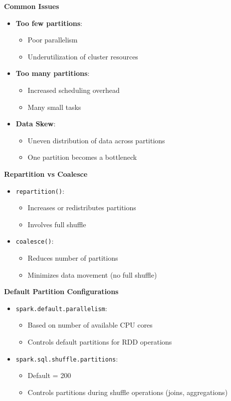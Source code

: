 \documentclass[10pt,a4paper]{article}
\begin{document}
	\textbf{Common Issues}
	\begin{itemize}
	    \item \textbf{Too few partitions}:
	    \begin{itemize}
	        \item Poor parallelism
	        \item Underutilization of cluster resources
	    \end{itemize}
	    
	    \item \textbf{Too many partitions}:
	    \begin{itemize}
	        \item Increased scheduling overhead
	        \item Many small tasks
	    \end{itemize}
	    
	    \item \textbf{Data Skew}:
	    \begin{itemize}
	        \item Uneven distribution of data across partitions
	        \item One partition becomes a bottleneck
	    \end{itemize}
	\end{itemize}
	
	\textbf{Repartition vs Coalesce}
	\begin{itemize}
	    \item \texttt{repartition()}:
	    \begin{itemize}
	        \item Increases or redistributes partitions
	        \item Involves full shuffle
	    \end{itemize}
	    
	    \item \texttt{coalesce()}:
	    \begin{itemize}
	        \item Reduces number of partitions
	        \item Minimizes data movement (no full shuffle)
	    \end{itemize}
	\end{itemize}
	
	\textbf{Default Partition Configurations}
	\begin{itemize}
	    \item \texttt{spark.default.parallelism}:
	    \begin{itemize}
	        \item Based on number of available CPU cores
	        \item Controls default partitions for RDD operations
	    \end{itemize}
	    
	    \item \texttt{spark.sql.shuffle.partitions}:
	    \begin{itemize}
	        \item Default = 200
	        \item Controls partitions during shuffle operations (joins, aggregations)
	    \end{itemize}
	\end{itemize}
	
\end{document}
